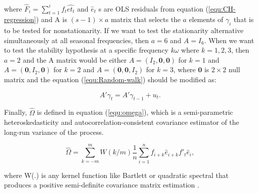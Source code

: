 \documentclass{article}
\begin{document}
\begin{appendices}
where $\hat{F}_i =\sum_{t=1}^{i}f_t \hat{et_t}$ and $\hat{e}_t$ s are OLS residuals from equation (\ref{equ:CH-regression}) and A is $(s-1) \times a$ matrix that selects the $a$ elements of $\gamma_i$ that is to be tested for nonstationarity. If we want to test the stationarity alternative simultaneously at all seasonal frequencies, then $a = 6$ and $A =I_6$. When we want to test the stability hypothesis at a specific frequency $k\omega$ where $k = 1,2,3$, then $a=2$ and the A matrix would be either $A = (I_2,\mathbf{0},\mathbf{0})$ for $k = 1$ and $A = (\mathbf{0},I_2,\mathbf{0})$ for $k = 2$ and $A = (\mathbf{0},\mathbf{0},I_2)$ for $k = 3$, where $\mathbf{0}$ is $2\times2$ null matrix and the equation (\ref{equ:Random-walk}) should be modified as:

\begin{equation}
 A'\gamma_t = A'\gamma_{t-1} + u_t.
\end{equation}

 Finally, $\hat{\Omega}$ is defined in equation (\ref{equ:omega}), which is a semi-parametric heteroskedasticity and autocorrelation-consistent covariance estimator of the long-run variance of the process. 
 
 \begin{equation}
 \label{equ:omega}
 \hat{\Omega} = \sum_{k=-m}^{m}W(k/m) \frac{1}{n} \sum_{i=1}^{n}f_{i+k} \hat{e}_{i+k}f'_t \hat{e}_i,
\end{equation}

where W(.) is any kernel function like Bartlett or quadratic spectral that produces a positive semi-definite covariance matrix estimation \cite{canova1995seasonal}. 

\end{appendices}


\raggedright

\end{document}
